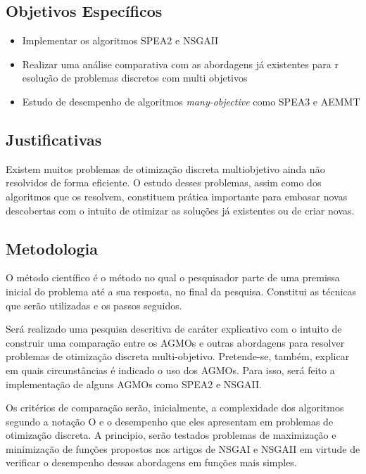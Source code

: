 \documentclass[]{article}
\begin{document}
\subsection{Objetivos Específicos}

	\begin{itemize}
		\item Implementar os algoritmos SPEA2\cite{SPEA2} e NSGAII\cite{NSGAII}
		\item Realizar uma análise comparativa com as abordagens já existentes para r esolução de problemas discretos com multi objetivos
		\item Estudo de desempenho de algoritmos \textit{many-objective} como SPEA3 e AEMMT
	\end{itemize}

\subsection{Justificativas}
	
	Existem muitos problemas de otimização discreta multiobjetivo ainda não resolvidos de forma eficiente. O estudo desses problemas, assim como dos algoritmos que os resolvem, constituem prática importante para embasar novas descobertas com o intuito de otimizar as soluções já existentes ou de criar novas.

\subsection{Metodologia}
	
	O método científico é o método no qual o pesquisador parte de uma premissa inicial do problema até a sua resposta, no final da pesquisa. Constitui as técnicas que serão utilizadas e os passos seguidos. 
	
	Será realizado uma pesquisa descritiva de caráter explicativo com o intuito de construir uma comparação entre os AGMOs e outras abordagens para resolver problemas de otimização discreta multi-objetivo. Pretende-se, também, explicar em quais circunstâncias é indicado o uso dos AGMOs. Para isso, será feito a implementação de alguns AGMOs como SPEA2\cite{SPEA2} e NSGAII\cite{NSGAII}.
	
	Os critérios de comparação serão, inicialmente, a complexidade dos algoritmos segundo a notação O e o desempenho que eles apresentam em problemas de otimização discreta. A principio, serão testados problemas de maximização e minimização de funções propostos nos artigos de NSGAI\cite{NSGAI} e NSGAII\cite{NSGAII} em virtude de verificar o desempenho dessas abordagens em funções mais simples.
	
\end{document}
